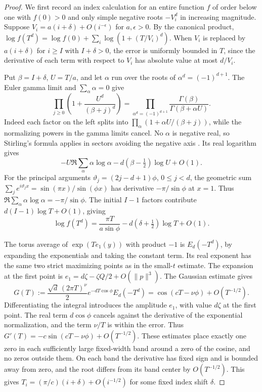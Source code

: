 \documentclass[11pt]{article}
\begin{document}
\begin{proof}
We first record an index calculation for an entire function
\(f\) of order below one with \(f(0)>0\) and only simple
negative roots \(-V_i^d\) in increasing magnitude.
Suppose \(V_i=a(i+\delta)+O(i^{-\epsilon})\) for
\(a,\epsilon>0\). By the canonical product,
\(\log f(T^d)=\log f(0)+\sum_i\log(1+(T/V_i)^d)\).
When \(V_i\) is replaced by \(a(i+\delta)\) for \(i\ge I\)
with \(I+\delta>0\), the error is uniformly bounded in \(T\),
since the derivative of each term with respect to \(V_i\)
has absolute value at most \(d/V_i\).

Put \(\beta=I+\delta\), \(U=T/a\), and let \(\alpha\)
run over the roots of \(\alpha^d=(-1)^{d+1}\).
The Euler gamma limit and \(\sum_\alpha\alpha=0\) give
\[
\prod_{j\ge0}\left(1+\frac{U^d}{(\beta+j)^d}\right)
=\prod_{\alpha^d=(-1)^{d+1}}
   \frac{\Gamma(\beta)}{\Gamma(\beta+\alpha U)}.
\]
Indeed each factor on the left splits into
\(\prod_\alpha(1+\alpha U/(\beta+j))\), while the
normalizing powers in the gamma limits cancel.
No \(\alpha\) is negative real, so Stirling's formula
applies in sectors avoiding the negative axis \cite{dlmf}.
Its real logarithm gives
\[
-U\Re\sum_\alpha\alpha\log\alpha
 -d(\beta-\tfrac12)\log U+O(1).
\]
For the principal arguments \(\vartheta_j=(2j-d+1)\phi\),
\(0\le j<d\), the geometric sum
\(\sum_j e^{i\vartheta_j x}=\sin(\pi x)/\sin(\phi x)\)
has derivative \(-\pi/\sin\phi\) at \(x=1\).
Thus \(\Re\sum_\alpha\alpha\log\alpha=-\pi/\sin\phi\).
The initial \(I-1\) factors contribute \(d(I-1)\log T+O(1)\),
giving
\begin{equation}\label{eq:offset-product}
\log f(T^d)=\frac{\pi T}{a\sin\phi}
            -d(\delta+\tfrac12)\log T+O(1).
\end{equation}

The torus average of \(\exp(T e_1(y))\) with product
\(-1\) is \(E_d(-T^d)\), by expanding the exponentials and
taking the constant term. Its real exponent has the same
two strict maximizing points as in the small-\(t\) estimate.
The expansion at the first point is
\(e_1=d\zeta-\zeta Q/2+O(\|p\|^3)\).
The Gaussian estimate gives
\[
G(T):=\frac{\sqrt d\,(2\pi T)^\nu}{2}
       e^{-dT\cos\phi}E_d(-T^d)
 =\cos(cT-\nu\phi)+O(T^{-1/2}).
\]
Differentiating the integral introduces the amplitude
\(e_1\), with value \(d\zeta\) at the first point.
The real term \(d\cos\phi\) cancels against the derivative
of the exponential normalization, and the term \(\nu/T\)
is within the error. Thus
\(G'(T)=-c\sin(cT-\nu\phi)+O(T^{-1/2})\).
These estimates place exactly one zero in each sufficiently
large fixed-width band around a zero of the cosine, and no
zeros outside them. On each band the derivative has fixed
sign and is bounded away from zero, and the root differs
from its band center by \(O(T^{-1/2})\).
This gives \(T_i=(\pi/c)(i+\delta)+O(i^{-1/2})\) for some
fixed index shift \(\delta\).


\end{proof}
\end{document}
